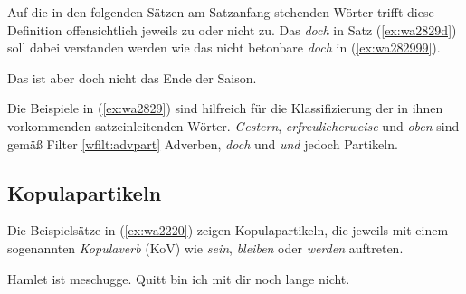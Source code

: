 
Auf die in den folgenden Sätzen am Satzanfang stehenden Wörter trifft diese Definition offensichtlich jeweils zu oder nicht zu.
Das \textit{doch} in Satz (\ref{ex:wa2829d}) soll dabei verstanden werden wie das nicht betonbare \textit{doch} in (\ref{ex:wa282999}).

\begin{exe}
  \ex\label{ex:wa2829}
  \begin{xlist}
  \end{xlist}
  \ex\label{ex:wa282999} Das ist aber doch nicht das Ende der Saison.
\end{exe}

Die Beispiele in (\ref{ex:wa2829}) sind hilfreich für die Klassifizierung der in ihnen vorkommenden satzeinleitenden Wörter.
\textit{Gestern}, \textit{erfreulicherweise} und \textit{oben} sind gemäß Filter \ref{wfilt:advpart} Adverben, \textit{doch} und \textit{und} jedoch Partikeln.


\subsection{Kopulapartikeln}

\label{sec:kopulapartikelwortklassen}


Die Beispielsätze in (\ref{ex:wa2220}) zeigen Kopulapartikeln, die jeweils mit einem sogenannten \textit{Kopulaverb} (KoV) wie \textit{sein}, \textit{bleiben} oder \textit{werden} auftreten.

\begin{exe}
  \ex\label{ex:wa2220}
  \begin{xlist}
    \ex Hamlet ist meschugge.
    \ex Quitt bin ich mit dir noch lange nicht.
  \end{xlist}
\end{exe}


